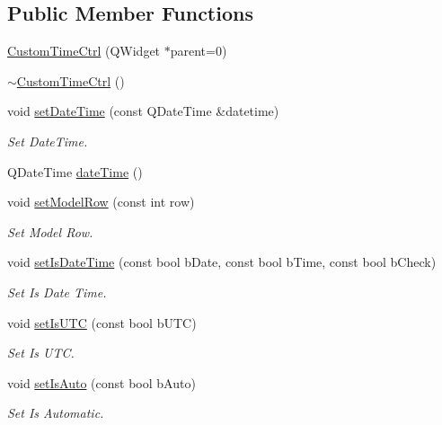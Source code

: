 \subsection*{Public Member Functions}
\begin{DoxyCompactItemize}
\item 
\hyperlink{class_custom_time_ctrl_a2f6010d9bad7179ebb6067bc8c9c91f9}{CustomTimeCtrl} (QWidget $\ast$parent=0)
\item 
\hyperlink{class_custom_time_ctrl_a7d1b4fcf67ce5c636aed9943e1fc155d}{$\sim$CustomTimeCtrl} ()
\item 
void \hyperlink{class_custom_time_ctrl_ac9509ea1b691b78aa01aaa7b7311a7dc}{setDateTime} (const QDateTime \&datetime)
\begin{DoxyCompactList}\small\item\em Set DateTime. \item\end{DoxyCompactList}\item 
QDateTime \hyperlink{class_custom_time_ctrl_ac9aa79a88d07a399653990876740abba}{dateTime} ()
\item 
void \hyperlink{class_custom_time_ctrl_a00f254de688011ef033711d6d7873c2d}{setModelRow} (const int row)
\begin{DoxyCompactList}\small\item\em Set Model Row. \item\end{DoxyCompactList}\item 
void \hyperlink{class_custom_time_ctrl_ae25047958d9b33a8cef17fbb9d5aad39}{setIsDateTime} (const bool bDate, const bool bTime, const bool bCheck)
\begin{DoxyCompactList}\small\item\em Set Is Date Time. \item\end{DoxyCompactList}\item 
void \hyperlink{class_custom_time_ctrl_a630a9b3e818a5d0eb1fd45b812f1de80}{setIsUTC} (const bool bUTC)
\begin{DoxyCompactList}\small\item\em Set Is UTC. \item\end{DoxyCompactList}\item 
void \hyperlink{class_custom_time_ctrl_a6defd95e5d915f8b9b08a8b338283120}{setIsAuto} (const bool bAuto)
\begin{DoxyCompactList}\small\item\em Set Is Automatic. \item\end{DoxyCompactList}\item 

\end{DoxyCompactItemize}
